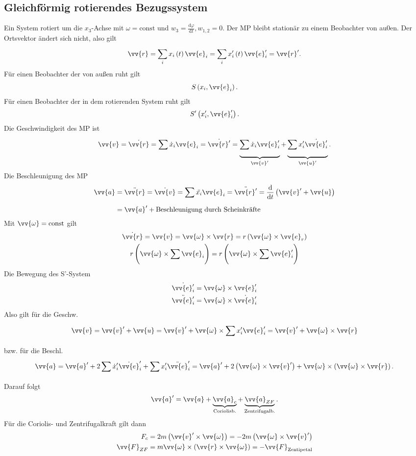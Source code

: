 \documentclass[a4paper,12pt]{article}
\begin{document}
\subsection{Gleichförmig rotierendes Bezugssystem}
Ein System rotiert um die $x_3$-Achse mit $\omega =\text{const}$ und $w_3=\tfrac{\text{d}\varphi }{\text{d}t},w_{1,2}=0$. Der MP bleibt stationär zu einem Beobachter von au0en. Der Ortsvektor ändert sich nicht, also gilt
\[ 
        \vv{r}=\sum_{i}^{}x_i\left(t\right)\vv{e}_i=\sum_{i}^{}x_i'\left(t\right)\vv{e}_i'=\vv{r}'
.\] 
Für einen Beobachter der von außen ruht gilt
\[ 
        S\left(x_i,\vv{e}_i\right)
.\] 
Für einen Beobachter der in dem rotierenden System ruht gilt
\[ 
        S'\left(x_i',\vv{e}_i'\right)
.\] 
Die Geschwindigkeit des MP ist
\[ 
        \vv{v}=\dot{\vv{r}}=\sum_{}^{}\dot{x}_i\vv{e}_i=\dot{\vv{r}'}=\underbrace{\sum_{}^{}\dot{x}_i\vv{e}_i'}_{\vv{v}'}+\underbrace{\sum_{}^{}x_i'\dot{\vv{e}_i'}}_{\vv{u}'}
.\] 
Die Beschleunigung des MP
\begin{align*}
        \vv{a}&=\ddot{\vv{r}}=\dot{\vv{v}}=\sum_{}^{}\ddot{x_i}\vv{e}_i=\ddot{\vv{r}'}=\dfrac{\text{d}}{\text{d}t}\left(\vv{v}'+\vv{u}\right)\\
              &=\vv{a}'+\text{Beschleunigung durch Scheinkräfte}
\end{align*}
Mit $\vv{\omega }=\text{const}$ gilt
\begin{gather*}
        \dot{\vv{r}}=\vv{v}=\vv{\omega }\times\vv{r}=r\left(\vv{\omega }\times\vv{e}_r\right)\\
        r\left(\vv{\omega }\times \sum_{}^{}\vv{e}_i\right)=r\left(\vv{\omega }\times \sum_{}^{}\vv{e}_i'\right)
\end{gather*}
Die Bewegung des S'-System 
\begin{align*}
        \dot{\vv{e}_i'}&=\vv{\omega }\times \vv{e}_i'\\
        \ddot{\vv{e}_i'}&=\vv{\omega }\times \dot{\vv{e}_i'}
\end{align*}
Also gilt für die Geschw.
\[
        \vv{v}=\vv{v}'+\vv{u}=\vv{v}'+\vv{\omega }\times \sum_{}^{}x_i'\vv{e}_i'=\vv{v}'+\vv{\omega }\times\vv{r} 
\]
bzw. für die Beschl.
\[ 
        \vv{a}=\vv{a}'+2\sum_{}^{}\dot{x}_i'\dot{\vv{e}}_i'+\sum_{}^{}x_i'\ddot{\vv{e}}_i'=\vv{a}'+2\left(\vv{\omega }\times\vv{v}'\right)+\vv{\omega }\times\left(\vv{\omega }\times\vv{r}\right)
.\] 
Darauf folgt
\[ 
        \vv{a}'=\vv{a}+\underbrace{\vv{a}_c}_{\text{Coriolisb.}}+\underbrace{\vv{a}_{ZF}}_{\text{Zentrifugalb.}}
.\] 
Für die Coriolis- und Zentrifugalkraft gilt dann
\begin{align*}
        F_c&=2m\left(\vv{v}'\times \vv{\omega }\right)=-2m\left(\vv{\omega }\times\vv{v}'\right)\\
        \vv{F}_{ZF}&=m\vv{\omega }\times\left(\vv{r}\times\vv{\omega }\right)=-\vv{F}_{\text{Zentipetal}}
\end{align*}
\end{document}
